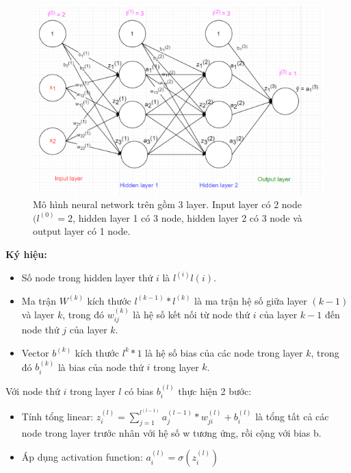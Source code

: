 \FloatBarrier
\begin{figure}[htp]
\begin{center}
\includegraphics[scale=1]{chap2/c2_figs/nn_full-2.png}
\end{center}
\caption{Mô hình neural network trên gồm 3 layer. Input layer có 2 node $(l^{(0)} = 2$, hidden layer 1 có 3 node, hidden layer 2 có 3 node và output layer có 1 node.}
\label{fig:NN}
\end{figure}
\FloatBarrier

\textbf{Ký hiệu:}
\begin{itemize}
\item Số node trong hidden layer thứ $i$ là $l^{(i)}l(i)$.

\item Ma trận $W^{(k)}$ kích thước $l^{(k-1)}*l^{(k)}$ là ma trận hệ số giữa layer $(k-1)$ và layer $k$, trong đó $w_{ij}^{(k)}$ là hệ số kết nối từ node thứ $i$ của layer $k-1$ đến node thứ $j$ của layer $k$.

\item Vector $b^{(k)}$ kích thước $l^{k} * 1$ là hệ số bias của các node trong layer $k$, trong đó $b_i^{(k)}$ là bias của node thứ $i$ trong layer $k$. 
\end{itemize}

Với node thứ $i$ trong layer $l$ có bias $b_i^{(l)}$ thực hiện 2 bước:
\begin{itemize}
\item Tính tổng linear: $z_i^{(l)} = \sum_{j=1}^{l^{(l-1)}} a_j^{(l-1)} * w_{ji}^{(l)} + b_i^{(l)}$ là tổng tất cả các node trong layer trước nhân với hệ số w tương ứng, rồi cộng với bias b.
\item Áp dụng activation function: $a_i^{(l)} = \sigma(z_i^{(l)})$
\end{itemize}

